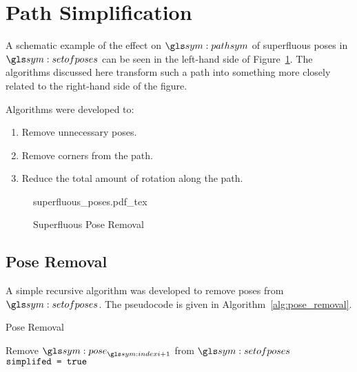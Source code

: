 \section{Path Simplification}%
\label{sec:path_simplification}

	A schematic example of the effect on $\pathsym$ of superfluous poses in
	$\setofposes$ can be seen in the left-hand side of
	Figure~\ref{fig:superfluous_poses}. The algorithms discussed here
	transform such a path into something more closely related to the
	right-hand side of the figure.

	Algorithms were developed to:

	\begin{enumerate}

		\item

			Remove unnecessary poses.

		\item

			Remove corners from the path.

		\item

			Reduce the total amount of rotation along the path.

	\end{enumerate}

	\begin{figure}[hb]
		\centering
		\def\svgwidth{\columnwidth}
		{superfluous_poses.pdf_tex}
		\caption{Superfluous Pose Removal}%
		\label{fig:superfluous_poses}
	\end{figure}

	\subsection{Pose Removal}%
	\label{sec:pose_removal}

		A simple recursive algorithm was developed to remove poses from
		$\setofposes$. The pseudocode is given in
		Algorithm~\ref{alg:pose_removal}.

		\begin{algorithm}[ht]
			\caption{Pose Removal}
			\label{alg:pose_removal}
			\begin{algorithmic}[1]
					\State{}
					\For{$\indexi \in [0, |\setofposes| -2]$}
						\label{alg:pose_removal:distance_check}
								\State{}Remove $\pose_{\indexi+1}$ from
								$\setofposes$
								\State{}$\texttt{simplifed = true}$
							\EndIf{}
						\EndIf{}
					\EndFor{}
						\State{}
					\EndIf{}
				\EndProcedure{}
			\end{algorithmic}
		\end{algorithm}

